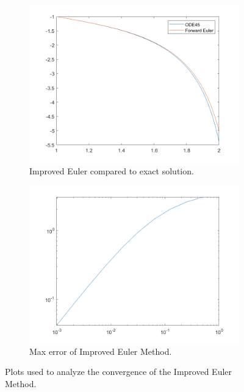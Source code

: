 \documentclass[12pt]{report}
\begin{document}
\begin{solution}
\begin{enumerate}
        \begin{figure}[H]
            \begin{subfigure}[b]{0.5\linewidth}
                \centering
                \includegraphics[width=\linewidth]{images/fe1.png}
                \caption{Improved Euler compared to exact solution.}
                \label{fig2:a}
                \vspace{4ex}
            \end{subfigure}%
            \begin{subfigure}[b]{0.5\linewidth}
                \centering
                \includegraphics[width=\linewidth]{images/fe2.png}
                \caption{Max error of Improved Euler Method.}
                \label{fig2:b}
                \vspace{4ex}
            \end{subfigure}
            \caption{Plots used to analyze the convergence of the Improved Euler Method.}
            \label{fig2}
        \end{figure}


\end{enumerate}
\end{solution}
\end{document}
